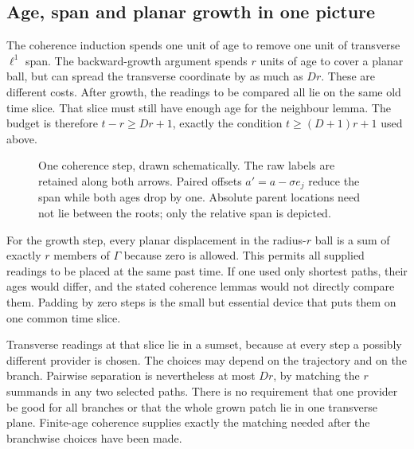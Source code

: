 \subsection{Age, span and planar growth in one picture}

The coherence induction spends one unit of age to remove one unit of transverse $\ell^1$ span. The backward-growth argument spends $r$ units of age to cover a planar ball, but can spread the transverse coordinate by as much as $Dr$. These are different costs. After growth, the readings to be compared all lie on the same old time slice. That slice must still have enough age for the neighbour lemma. The budget is therefore $t-r\ge Dr+1$, exactly the condition $t\ge(D+1)r+1$ used above.

\begin{figure}[ht]
\centering
{}
\caption{One coherence step, drawn schematically. The raw labels are retained along both arrows. Paired offsets $a'=a-\sigma e_j$ reduce the span while both ages drop by one. Absolute parent locations need not lie between the roots; only the relative span is depicted.}
\end{figure}

For the growth step, every planar displacement in the radius-$r$ ball is a sum of exactly $r$ members of $\Gamma$ because zero is allowed. This permits all supplied readings to be placed at the same past time. If one used only shortest paths, their ages would differ, and the stated coherence lemmas would not directly compare them. Padding by zero steps is the small but essential device that puts them on one common time slice.

Transverse readings at that slice lie in a sumset, because at every step a possibly different provider is chosen. The choices may depend on the trajectory and on the branch. Pairwise separation is nevertheless at most $Dr$, by matching the $r$ summands in any two selected paths. There is no requirement that one provider be good for all branches or that the whole grown patch lie in one transverse plane. Finite-age coherence supplies exactly the matching needed after the branchwise choices have been made.
